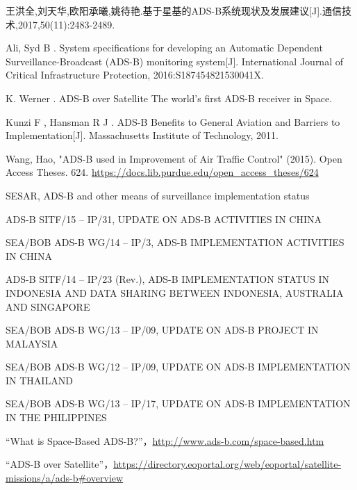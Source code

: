 
\begin{thebibliography}{99}

王洪全,刘天华,欧阳承曦,姚待艳.基于星基的ADS-B系统现状及发展建议[J].通信技术,2017,50(11):2483-2489.




 Ali, Syd B . System specifications for developing an Automatic Dependent Surveillance-Broadcast (ADS-B) monitoring system[J]. International Journal of Critical Infrastructure Protection, 2016:S187454821530041X.

 K. Werner . ADS-B over Satellite The world’s first ADS-B receiver in Space.

 Kunzi F , Hansman R J . ADS-B Benefits to General Aviation and Barriers to Implementation[J]. Massachusetts Institute of Technology, 2011.

 Wang, Hao, "ADS-B used in Improvement of Air Traffic Control" (2015). Open Access Theses. 624.
\url{https://docs.lib.purdue.edu/open_access_theses/624}

 SESAR, ADS-B and other means of surveillance implementation status

 ADS-B SITF/15 – IP/31, UPDATE ON ADS-B ACTIVITIES IN CHINA

 SEA/BOB ADS-B WG/14 – IP/3, ADS-B IMPLEMENTATION ACTIVITIES IN CHINA

 ADS-B SITF/14 – IP/23 (Rev.), ADS-B IMPLEMENTATION STATUS IN INDONESIA AND DATA SHARING BETWEEN INDONESIA, AUSTRALIA AND SINGAPORE

 SEA/BOB ADS-B WG/13 – IP/09, UPDATE ON ADS-B PROJECT IN MALAYSIA

 SEA/BOB ADS-B WG/12 – IP/09, UPDATE ON ADS-B IMPLEMENTATION IN THAILAND

 SEA/BOB ADS-B WG/13 – IP/17, UPDATE ON ADS-B IMPLEMENTATION IN THE PHILIPPINES



“What is Space-Based ADS-B?”，\url{http://www.ads-b.com/space-based.htm}

“ADS-B over Satellite”，\url{https://directory.eoportal.org/web/eoportal/satellite-missions/a/ads-b#overview}


\end{thebibliography}
